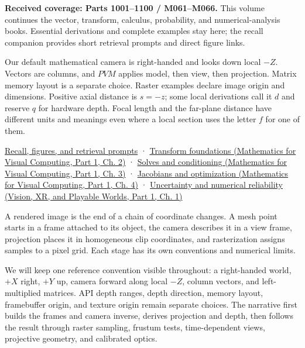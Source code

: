 \textbf{Received coverage: Parts 1001--1100 / M061--M066.} This volume continues the vector, transform, calculus, probability, and numerical-analysis books. Essential derivations and complete examples stay here; the recall companion provides short retrieval prompts and direct figure links.

Our default mathematical camera is right-handed and looks down local \(-Z\). Vectors are columns, and \(PVM\) applies model, then view, then projection. Matrix memory layout is a separate choice. Raster examples declare image origin and dimensions. Positive axial distance is \(s=-z\); some local derivations call it \(d\) and reserve \(q\) for hardware depth. Focal length and the far-plane distance have different units and meanings even where a local section uses the letter \(f\) for one of them.

\hyperref[appendix-a2b71a18f5a2]{Recall, figures, and retrieval prompts} · \href{../02-Mathematics-for-Visual-Computing-P01/main.pdf\#nameddest=01-foundations-i-ch018-keep-the-promises-visible-while-moving-between-representations}{Transform foundations (Mathematics for Visual Computing, Part 1, Ch. 2)} · \href{../02-Mathematics-for-Visual-Computing-P01/main.pdf\#nameddest=01-foundations-i-ch019-the-graphics-problem-hiding-inside-a-matrix-equation}{Solves and conditioning (Mathematics for Visual Computing, Part 1, Ch. 3)} · \href{../02-Mathematics-for-Visual-Computing-P01/main.pdf\#nameddest=01-foundations-i-ch020-functions-limits-continuity-and-scalar-change}{Jacobians and optimization (Mathematics for Visual Computing, Part 1, Ch. 4)} · \href{../07-Vision-XR-and-Playable-Worlds-P01/main.pdf\#nameddest=02-foundations-ii-ch039-learning-route}{Uncertainty and numerical reliability (Vision, XR, and Playable Worlds, Part 1, Ch. 1)}

A rendered image is the end of a chain of coordinate changes. A mesh point starts in a frame attached to its object, the camera describes it in a view frame, projection places it in homogeneous clip coordinates, and rasterization assigns samples to a pixel grid. Each stage has its own conventions and numerical limits.

We will keep one reference convention visible throughout: a right-handed world, \(+X\) right, \(+Y\) up, camera forward along local \(-Z\), column vectors, and left-multiplied matrices. API depth ranges, depth direction, memory layout, framebuffer origin, and texture origin remain separate choices. The narrative first builds the frames and camera inverse, derives projection and depth, then follows the result through raster sampling, frustum tests, time-dependent views, projective geometry, and calibrated optics.

